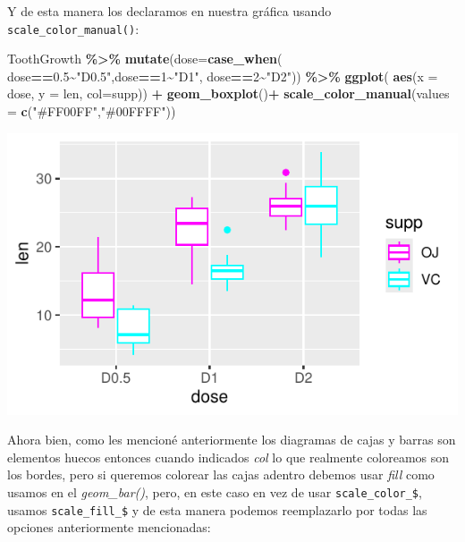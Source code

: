 \documentclass[
]{book}
\newenvironment{Shaded}{\begin{snugshade}}{\end{snugshade}}
\newcommand{\AttributeTok}[1]{\textcolor[rgb]{0.13,0.29,0.53}{#1}}
\newcommand{\DecValTok}[1]{\textcolor[rgb]{0.00,0.00,0.81}{#1}}
\newcommand{\FloatTok}[1]{\textcolor[rgb]{0.00,0.00,0.81}{#1}}
\newcommand{\FunctionTok}[1]{\textcolor[rgb]{0.13,0.29,0.53}{\textbf{#1}}}
\newcommand{\NormalTok}[1]{#1}
\newcommand{\SpecialCharTok}[1]{\textcolor[rgb]{0.81,0.36,0.00}{\textbf{#1}}}
\newcommand{\StringTok}[1]{\textcolor[rgb]{0.31,0.60,0.02}{#1}}
\begin{document}
\hfill\break
Y de esta manera los declaramos en nuestra gráfica usando \texttt{scale\_color\_manual()}:\\

\begin{Shaded}
\begin{Highlighting}[]
\NormalTok{ToothGrowth }\SpecialCharTok{\%\textgreater{}\%}  \FunctionTok{mutate}\NormalTok{(}\AttributeTok{dose=}\FunctionTok{case\_when}\NormalTok{(}
\NormalTok{  dose}\SpecialCharTok{==}\FloatTok{0.5}\SpecialCharTok{\textasciitilde{}}\StringTok{"D0.5"}\NormalTok{,dose}\SpecialCharTok{==}\DecValTok{1}\SpecialCharTok{\textasciitilde{}}\StringTok{"D1"}\NormalTok{, dose}\SpecialCharTok{==}\DecValTok{2}\SpecialCharTok{\textasciitilde{}}\StringTok{"D2"}\NormalTok{)) }\SpecialCharTok{\%\textgreater{}\%} \FunctionTok{ggplot}\NormalTok{(}
    \FunctionTok{aes}\NormalTok{(}\AttributeTok{x =}\NormalTok{ dose, }\AttributeTok{y =}\NormalTok{ len, }\AttributeTok{col=}\NormalTok{supp)) }\SpecialCharTok{+}  \FunctionTok{geom\_boxplot}\NormalTok{()}\SpecialCharTok{+}
  \FunctionTok{scale\_color\_manual}\NormalTok{(}\AttributeTok{values =} \FunctionTok{c}\NormalTok{(}\StringTok{"\#FF00FF"}\NormalTok{,}\StringTok{"\#00FFFF"}\NormalTok{))}
\end{Highlighting}
\end{Shaded}

\begin{center}\includegraphics{R_Manual_files/figure-latex/unnamed-chunk-212-1} \end{center}

\hfill\break
Ahora bien, como les mencioné anteriormente los diagramas de cajas y barras son elementos huecos entonces cuando indicados \emph{col} lo que realmente coloreamos son los bordes, pero si queremos colorear las cajas adentro debemos usar \emph{fill} como usamos en el \emph{geom\_bar()}, pero, en este caso en vez de usar \texttt{scale\_color\_\$}, usamos \texttt{scale\_fill\_\$} y de esta manera podemos reemplazarlo por todas las opciones anteriormente mencionadas:\\
\end{document}
